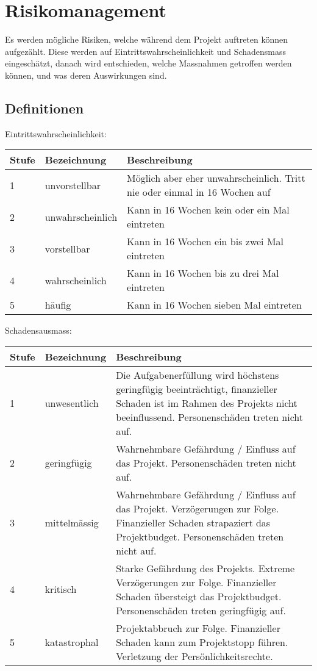 \clearpage

\section{Risikomanagement}

Es werden mögliche Risiken, welche während dem Projekt auftreten können aufgezählt. Diese werden auf Eintrittswahrscheinlichkeit und Schadensmass eingeschätzt, danach wird entschieden, welche Massnahmen getroffen werden können, und was deren Auswirkungen sind.

\subsection{Definitionen}
\label{sssec:Def}
\vspace{1em}
\noindent
Eintrittswahrscheinlichkeit:

\vspace{1em}
\noindent
\begin{tabularx}{\textwidth}{|l|l|X|}
	\hline
	\textbf{Stufe} & \textbf{Bezeichnung} & \textbf{Beschreibung} \\
	\hline
	1 & unvorstellbar & Möglich aber eher unwahrscheinlich. Tritt nie oder einmal in 16 Wochen auf \\
	\hline
	2 & unwahrscheinlich & Kann in 16 Wochen kein oder ein Mal eintreten\\
	\hline
	3 & vorstellbar & Kann in 16 Wochen ein bis zwei Mal eintreten \\
	\hline
	4 & wahrscheinlich & Kann in 16 Wochen bis zu drei Mal eintreten \\
	\hline
	5 & häufig & Kann in 16 Wochen sieben Mal eintreten\\
	\hline
\end{tabularx}

\vspace{1em}
\noindent
Schadensausmass:

\vspace{1em}
\noindent
\begin{tabularx}{\textwidth}{|l|l|X|}
	\hline
	\textbf{Stufe} & \textbf{Bezeichnung} & \textbf{Beschreibung} \\
	\hline
	1 & unwesentlich & Die Aufgabenerfüllung wird höchstens geringfügig beeinträchtigt, finanzieller Schaden ist im Rahmen des Projekts nicht beeinflussend. Personenschäden treten nicht auf. \\
	\hline
	2 & geringfügig & Wahrnehmbare Gefährdung / Einfluss auf das Projekt. Personenschäden treten nicht auf. \\
	\hline
	3 & mittelmässig & Wahrnehmbare Gefährdung / Einfluss auf das Projekt. Verzögerungen zur Folge. Finanzieller Schaden strapaziert das Projektbudget. Personenschäden treten nicht auf. \\
	\hline
	4 & kritisch & Starke Gefährdung des Projekts. Extreme Verzögerungen zur Folge. Finanzieller Schaden übersteigt das Projektbudget. Personenschäden treten geringfügig auf.\\
	\hline
	5 & katastrophal & Projektabbruch zur Folge. Finanzieller Schaden kann zum Projektstopp führen. Verletzung der Persönlichkeitsrechte. \\
	\hline
\end{tabularx}


